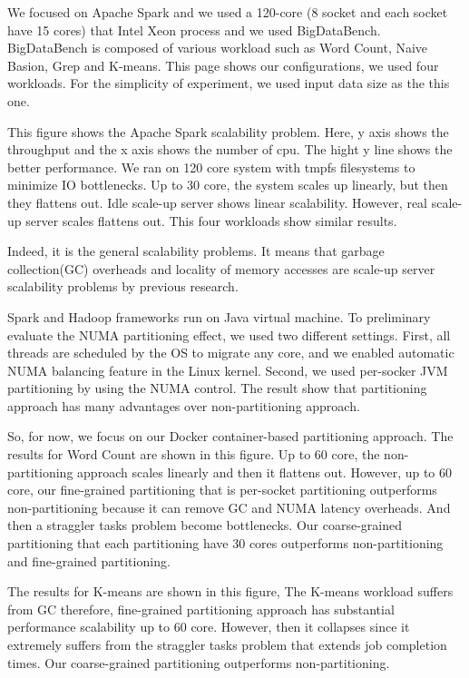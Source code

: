 We focused on Apache Spark and we used a 120-core (8 socket and each socket have 15 cores) that 
Intel Xeon process and we used BigDataBench.
BigDataBench is composed of various workload such as Word Count, Naive
Basion, Grep and K-means.  
This page shows our configurations, we used four workloads.
For the simplicity of experiment, we used input data size as the this one.

This figure shows the Apache Spark scalability problem.
Here, y axis shows the throughput and the x axis shows the number of cpu.
The hight y line shows the better performance.
We ran on 120 core system with tmpfs filesystems to minimize IO bottlenecks.
Up to 30 core, the system scales up linearly, but then they flattens out.
Idle scale-up server shows linear scalability.
However, real scale-up server scales flattens out.
This four workloads show similar results. 

Indeed, it is  the general scalability problems.
It means that garbage collection(GC) overheads and locality of memory accesses are scale-up server scalability
problems by previous research.

Spark and Hadoop frameworks run on Java virtual machine.
To preliminary evaluate the NUMA partitioning effect, we used two different settings.
First, all threads are scheduled by the OS to migrate any core, and we enabled
automatic NUMA balancing feature in the Linux kernel.
Second, we used per-socker JVM partitioning by using the NUMA control. 
The result show that partitioning approach has many advantages over
non-partitioning approach.

So, for now, we focus on our Docker container-based partitioning approach.
The results for Word Count are shown in this figure.
Up to 60 core, the non-partitioning approach scales linearly and then it flattens out.
However, up to 60 core, our fine-grained partitioning that is
per-socket partitioning outperforms non-partitioning 
because it can remove GC and NUMA latency overheads.
And then a straggler tasks problem become bottlenecks.
Our coarse-grained partitioning 
that each partitioning have 30 cores outperforms
non-partitioning and fine-grained partitioning.

The results for K-means are shown in this figure,
The K-means workload suffers from GC therefore, fine-grained partitioning
approach has substantial performance scalability up to 60 core.
However, then it collapses since it extremely suffers from the
straggler tasks problem that extends job completion times.
Our coarse-grained partitioning outperforms non-partitioning.

